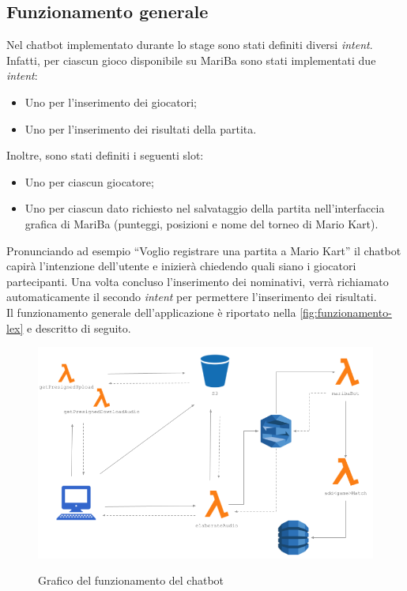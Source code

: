 	\subsection{Funzionamento generale}
	
	\noindent Nel \gls{chatbot} implementato durante lo stage sono stati definiti diversi \emph{intent}. Infatti, per ciascun gioco disponibile su MariBa sono stati implementati due \emph{intent}:
	\begin{itemize}
		\item Uno per l'inserimento dei giocatori;
		\item Uno per l'inserimento dei risultati della partita.
	\end{itemize}
	Inoltre, sono stati definiti i seguenti slot:
	\begin{itemize}
		\item Uno per ciascun giocatore;
		\item Uno per ciascun dato richiesto nel salvataggio della partita nell'interfaccia grafica di MariBa (punteggi, posizioni e nome del torneo di Mario Kart).
	\end{itemize}
	
	\noindent Pronunciando ad esempio ``Voglio registrare una partita a Mario Kart'' il \gls{chatbot} capirà l'intenzione
	dell'utente e inizierà chiedendo quali siano i giocatori partecipanti. Una volta concluso l'inserimento dei
	nominativi, verrà richiamato automaticamente il secondo \emph{intent} per permettere l'inserimento dei risultati. \\
	
	\noindent Il funzionamento generale dell'applicazione è riportato nella \autoref{fig:funzionamento-lex} e descritto di seguito.
	
	\begin{figure}[H]
		\centering
		\includegraphics[width=12cm]{immagini/funzionamentoLex.png} \\
		\caption{\label{fig:funzionamento-lex} Grafico del funzionamento del chatbot}
	\end{figure}

